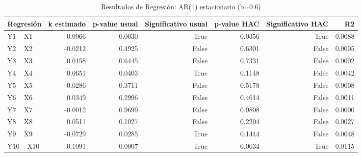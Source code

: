 \begin{table}
\caption{Resultados de Regresión: AR(1) estacionario (b=0.6)}
\label{tab:res_i}
\begin{tabular}{lrrrrrr}
\toprule
Regresión & k estimado & p-value usual & Significativo usual & p-value HAC & Significativo HAC & R2 \\
\midrule
Y1 ~ X1 & 0.0966 & 0.0030 & True & 0.0356 & True & 0.0088 \\
Y2 ~ X2 & -0.0212 & 0.4925 & False & 0.6301 & False & 0.0005 \\
Y3 ~ X3 & 0.0158 & 0.6445 & False & 0.7331 & False & 0.0002 \\
Y4 ~ X4 & 0.0651 & 0.0403 & True & 0.1148 & False & 0.0042 \\
Y5 ~ X5 & 0.0286 & 0.3711 & False & 0.5178 & False & 0.0008 \\
Y6 ~ X6 & 0.0349 & 0.2996 & False & 0.4614 & False & 0.0011 \\
Y7 ~ X7 & -0.0012 & 0.9699 & False & 0.9808 & False & 0.0000 \\
Y8 ~ X8 & 0.0511 & 0.1027 & False & 0.2204 & False & 0.0027 \\
Y9 ~ X9 & -0.0729 & 0.0285 & True & 0.1444 & False & 0.0048 \\
Y10 ~ X10 & -0.1091 & 0.0007 & True & 0.0034 & True & 0.0115 \\
\bottomrule
\end{tabular}
\end{table}
